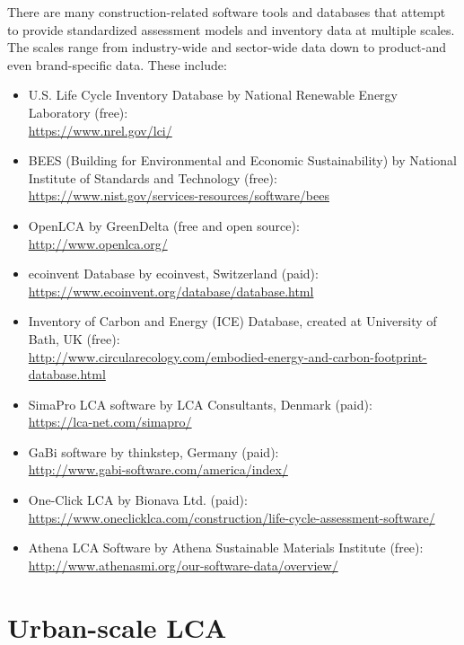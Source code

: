 \documentclass[10pt]{article}
\begin{document}
There are many construction-related software tools and databases that attempt to provide standardized assessment models and inventory data at multiple scales. The scales range from industry-wide and sector-wide data down to product-and even brand-specific data.  These include:

\begin{itemize}
\item U.S. Life Cycle Inventory Database by National Renewable Energy Laboratory (free): \\\url{https://www.nrel.gov/lci/}
\item BEES (Building for Environmental and Economic Sustainability) by National Institute of Standards and Technology (free): \\\url{https://www.nist.gov/services-resources/software/bees}
    \item OpenLCA by GreenDelta (free and open source): \\\url{http://www.openlca.org/}
    \item ecoinvent Database by ecoinvest, Switzerland (paid): \\\url{https://www.ecoinvent.org/database/database.html}
    \item Inventory of Carbon and Energy (ICE) Database, created at University of Bath, UK (free): \\\url{http://www.circularecology.com/embodied-energy-and-carbon-footprint-database.html}
    \item SimaPro LCA software by LCA Consultants, Denmark (paid): \\\url{https://lca-net.com/simapro/}
    \item GaBi software by thinkstep, Germany (paid): \\\url{http://www.gabi-software.com/america/index/}
    \item One-Click LCA by Bionava Ltd. (paid): \\\url{https://www.oneclicklca.com/construction/life-cycle-assessment-software/}
    \item Athena LCA Software by Athena Sustainable Materials Institute (free): \\\url{http://www.athenasmi.org/our-software-data/overview/}
\end{itemize}

\section{Urban-scale LCA}
\end{document}

